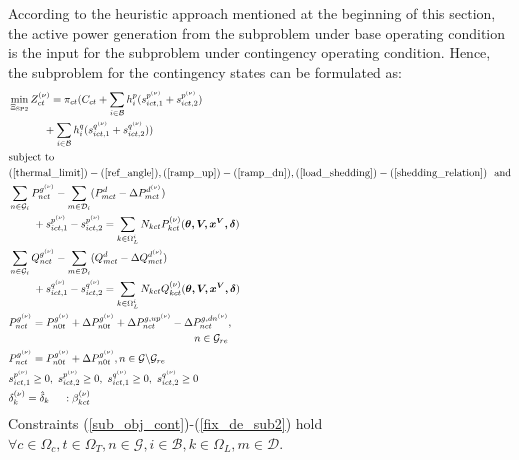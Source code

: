 \documentclass[journal]{IEEEtran}
\begin{document}
According to the heuristic approach mentioned at the beginning of this section, the active power generation from the subproblem under base operating condition is the input for the subproblem under contingency operating condition. Hence, the subproblem for the contingency states can be formulated as:
\begin{align}
&\min_{\Xi_{\text{SP2}}} Z_{ct}^{(\nu)}=\pi_{ct}(C_{ct}+\sum_{i\in \mathcal{B}}h_i^p(s_{ict,1}^{p^{(\nu)}}+s_{ict,2}^{p^{(\nu)}}) \nonumber \\
&\ \ \ \ \ \ \ \ \ \ +\sum_{i\in \mathcal{B}}h_i^q(s_{ict,1}^{q^{(\nu)}}+s_{ict,2}^{q^{(\nu)}}))  \label{sub_obj_cont}  \\
&\text{subject to}   \nonumber \\
&(\ref{thermal_limit})-(\ref{ref_angle}),(\ref{ramp_up})-(\ref{ramp_dn}),(\ref{load_shedding})-(\ref{shedding_relation}) \ \ \text{and} \nonumber \\  
&\sum_{n \in \mathcal{G}_i}P^{g^{(\nu)}}_{nct}-\sum_{m \in \mathcal{D}_i}(P^d_{mct}-\Delta P^{d^{(\nu)}}_{mct})  \nonumber \\
&\ \ \ \ \ \ \ +s^{p^{(\nu)}}_{ict,1}-s^{p^{(\nu)}}_{ict,2}=\sum_{k\in \Omega_{L}^i } N_{kct}P^{(\nu)}_{kct}(\bm{\theta,V,x^V,\delta}) \label{p_bal_sp2}  \\
&\sum_{n \in \mathcal{G}_i}Q^{g^{(\nu)}}_{nct}-\sum_{m \in \mathcal{D}_i}(Q^d_{mct}-\Delta Q^{d^{(\nu)}}_{mct})  \nonumber \\
&\ \ \ \ \ \ \ +s^{q^{(\nu)}}_{ict,1}-s^{q^{(\nu)}}_{ict,2}=\sum_{k\in \Omega_{L}^i } N_{kct}Q^{(\nu)}_{kct}(\bm{\theta,V,x^V,\delta}) \label{q_bal_sp2}  \\
&P_{nct}^{g^{(\nu)}}=P_{n0t}^{g^{(\nu)}}+\Delta P^{g^{(\nu)}}_{n0t}+\Delta P_{nct}^{g,up^{(\nu)}}-\Delta P_{nct}^{g,dn^{(\nu)}}, \nonumber \\
&\ \ \ \ \ \ \ \ \ \ \ \ \ \ \ \ \ \ \ \ \ \ \ \ \ \ \ \ \ \ \ \ \ \ \ \ \ \ \ \ \ \ \ \ \ \ \ \ \ \ \ \ \ n\in \mathcal{G}_{re}    \label{ramp_gen_sub2} \\
&P_{nct}^{g^{(\nu)}}=P_{n0t}^{g^{(\nu)}}+\Delta P^{g^{(\nu)}}_{n0t}, n\in \mathcal{G}\backslash\mathcal{G}_{re}  \label{g_fix_sub2}  \\
&s_{ict,1}^{p^{(\nu)}} \ge 0, \ s_{ict,2}^{p^{(\nu)}} \ge 0,\ s_{ict,1}^{q^{(\nu)}} \ge 0, \ s_{ict,2}^{q^{(\nu)}} \ge 0    \label{slack_range_sub2}   \\
&\delta_k^{(\nu)}=\hat{\delta}_k \ \ \ \ : \beta_{kct}^{(\nu)}     \label{fix_de_sub2} 
\end{align} 
Constraints (\ref{sub_obj_cont})-(\ref{fix_de_sub2}) hold $\forall c \in \Omega_c,t \in \Omega_T, n\in \mathcal{G}, i\in \mathcal{B}, k \in \Omega_L,m \in \mathcal{D}$.
\end{document}
